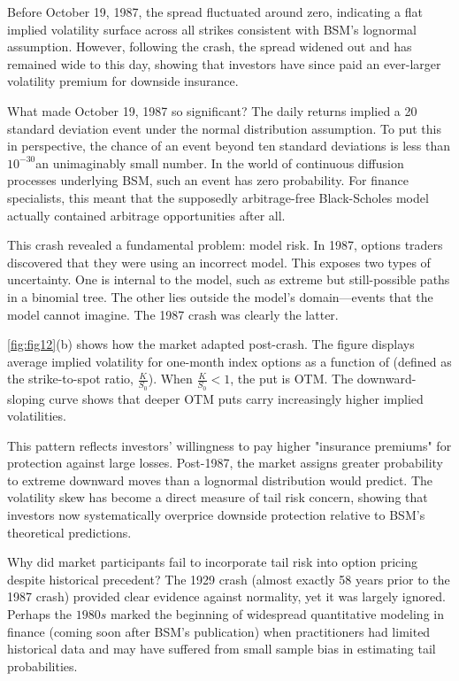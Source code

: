 Before October 19, 1987, the spread fluctuated around zero, indicating a flat implied volatility surface across all strikes consistent with BSM’s lognormal assumption. However, following the crash, the spread widened out and has remained wide to this day, showing that investors have since paid an ever-larger volatility premium for downside insurance.

What made October 19, 1987 so significant? The daily returns implied a 20 standard deviation event under the normal distribution assumption. To put this in perspective, the chance of an event beyond ten standard deviations is less than ${10}^{-30}$\textemdash an unimaginably small number. In the world of continuous diffusion processes underlying BSM, such an event has zero probability. For finance specialists, this meant that the supposedly arbitrage-free Black-Scholes model actually contained arbitrage opportunities after all.

This crash revealed a fundamental problem: model risk. In 1987, options traders discovered that they were using an incorrect model. This exposes two types of uncertainty. One is internal to the model, such as extreme but still-possible paths in a binomial tree. The other lies outside the model’s domain—events that the model cannot imagine. The 1987 crash was clearly the latter.

\autoref{fig:fig12}(b) \citep{seo2019option} shows how the market adapted post-crash. The figure displays average implied volatility for one-month index options as a function of  (defined as the strike-to-spot ratio, $\frac{K}{S_0}$). When $\frac{K}{S_0} < 1$, the put is OTM. The downward-sloping curve shows that deeper OTM puts carry increasingly higher implied volatilities. 

This pattern reflects investors' willingness to pay higher "insurance premiums" for protection against large losses. Post-1987, the market assigns greater probability to extreme downward moves than a lognormal distribution would predict. The volatility skew has become a direct measure of tail risk concern, showing that investors now systematically overprice downside protection relative to BSM's theoretical predictions.

Why did market participants fail to incorporate tail risk into option pricing despite historical precedent? The 1929 crash (almost exactly 58 years prior to the 1987 crash) provided clear evidence against normality, yet it was largely ignored. Perhaps the $1980s$ marked the beginning of widespread quantitative modeling in finance (coming soon after BSM's publication) when practitioners had limited historical data and may have suffered from small sample bias in estimating tail probabilities.

